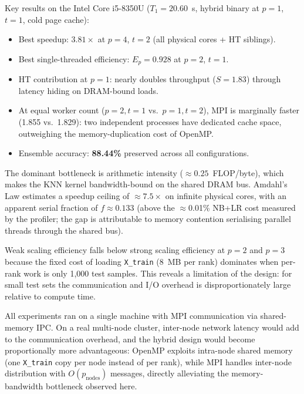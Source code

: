 \documentclass[12pt,a4paper]{article}
\begin{document}
Key results on the Intel Core i5-8350U ($T_1 = 20.60$~s, hybrid binary at
$p=1$, $t=1$, cold page cache):
\begin{itemize}
  \item Best speedup: $\mathbf{3.81\times}$ at $p=4$, $t=2$ (all physical
        cores + HT siblings).
  \item Best single-threaded efficiency: $E_p = 0.928$ at $p=2$, $t=1$.
  \item HT contribution at $p=1$: nearly doubles throughput ($S=1.83$)
        through latency hiding on DRAM-bound loads.
  \item At equal worker count ($p=2,t=1$ vs.\ $p=1,t=2$), MPI is marginally
        faster (1.855 vs.\ 1.829): two independent processes have dedicated
        cache space, outweighing the memory-duplication cost of OpenMP.
  \item Ensemble accuracy: \textbf{88.44\%} preserved across all
        configurations.
\end{itemize}

The dominant bottleneck is arithmetic intensity ($\approx 0.25$~FLOP/byte),
which makes the KNN kernel bandwidth-bound on the shared DRAM bus.
Amdahl's Law estimates a speedup ceiling of $\approx 7.5\times$ on infinite
physical cores, with an apparent serial fraction of $f \approx 0.133$
(above the $\approx$0.01\% NB+LR cost measured by the profiler; the gap is
attributable to memory contention serialising parallel threads through the
shared bus).

Weak scaling efficiency falls below strong scaling efficiency at $p=2$ and
$p=3$ because the fixed cost of loading \texttt{X\_train} (8~MB per rank)
dominates when per-rank work is only 1{,}000 test samples. This reveals a
limitation of the design: for small test sets the communication and I/O
overhead is disproportionately large relative to compute time.

All experiments ran on a single machine with MPI communication via
shared-memory IPC. On a real multi-node cluster, inter-node network
latency would add to the communication overhead, and the hybrid design
would become proportionally more advantageous: OpenMP exploits intra-node
shared memory (one \texttt{X\_train} copy per node instead of per rank),
while MPI handles inter-node distribution with $O(p_\text{nodes})$ messages,
directly alleviating the memory-bandwidth bottleneck observed here.

\end{document}
